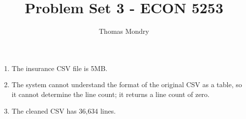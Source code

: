 \documentclass{article}
\title{Problem Set 3 - ECON 5253}
\author{Thomas Mondry}
\begin{document}
\maketitle

\begin{enumerate}
    \item The insurance CSV file is 5MB.
    \item The system cannot understand the format of the original CSV as a table, so it cannot determine the line count; it returns a line count of zero.
    \item The cleaned CSV has 36,634 lines.
\end{enumerate}
\end{document}
